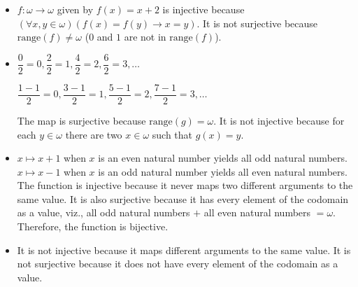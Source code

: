 \begin{itemize}
\item 
$f \colon \omega \to \omega$ given by $f(x) = x + 2$ is injective because $(\forall x,y \in \omega)(f(x) = f(y) \to x = y)$. It is not surjective because $\mathrm{range}(f) \not\equal \omega$ ($0$ and $1$ are not in $\mathrm{range}(f)$).

\item 
$\dfrac{0}{2} = 0, \dfrac{2}{2} = 1, \dfrac{4}{2} = 2, \dfrac{6}{2} = 3, \dots$

$\dfrac{1-1}{2} = 0, \dfrac{3-1}{2} = 1, \dfrac{5-1}{2} = 2, \dfrac{7-1}{2} = 3, \dots$

The map is surjective because $\mathrm{range}(g) \equal \omega$. It is not injective because for each $y \in \omega$ there are two $x \in \omega$ such that $g(x) = y$.

\item
$x \mapsto x + 1$ when $x$ is an even natural number yields all odd natural numbers. $x \mapsto x - 1$ when $x$ is an odd natural number yields all even natural numbers. The function is injective because it never maps two different arguments to the same value. It is also surjective because it has every element of the codomain as a value, viz., all odd natural numbers $+$ all even natural numbers $= \omega$. Therefore, the function is bijective.

\item 
It is not injective because it maps different arguments to the same value. It is not surjective because it does not have every element of the codomain as a value.

\end{itemize}